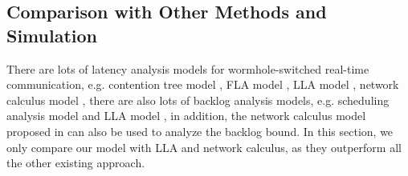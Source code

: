 \documentclass[10pt,journal]{IEEEtran}
\begin{document}
\subsection{Comparison with Other Methods and Simulation}
There are lots of latency analysis models for wormhole-switched real-time communication, e.g. contention tree model \cite{LuJS05}, FLA model \cite{Shi:2008:RCA:1397757.1397996}, LLA model \cite{73}, network calculus model \cite{Qian489900}, there are also lots of backlog analysis models, e.g. scheduling analysis model \cite{Manolache:2006:BSO:1131481.1131683} and LLA model \cite{189}, in addition, the network calculus model proposed in \cite{Qian489900} can also be used to analyze the backlog bound. In this section, we only compare our model with LLA and network calculus, as they outperform all the other existing approach.
\end{document}
